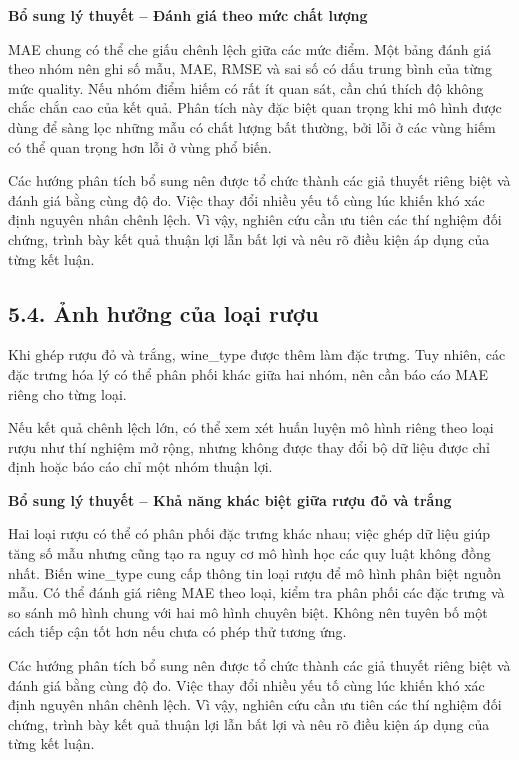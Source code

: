 \documentclass[12pt,a4paper,oneside]{article}
\begin{document}
\par\noindent\textbf{Bổ sung lý thuyết -- Đánh giá theo mức chất lượng}\par
MAE chung có thể che giấu chênh lệch giữa các mức điểm. Một bảng đánh giá theo nhóm nên ghi số mẫu, MAE, RMSE và sai số có dấu trung bình của từng mức quality. Nếu nhóm điểm hiếm có rất ít quan sát, cần chú thích độ không chắc chắn cao của kết quả. Phân tích này đặc biệt quan trọng khi mô hình được dùng để sàng lọc những mẫu có chất lượng bất thường, bởi lỗi ở các vùng hiếm có thể quan trọng hơn lỗi ở vùng phổ biến.\par

Các hướng phân tích bổ sung nên được tổ chức thành các giả thuyết riêng biệt và đánh giá bằng cùng độ đo. Việc thay đổi nhiều yếu tố cùng lúc khiến khó xác định nguyên nhân chênh lệch. Vì vậy, nghiên cứu cần ưu tiên các thí nghiệm đối chứng, trình bày kết quả thuận lợi lẫn bất lợi và nêu rõ điều kiện áp dụng của từng kết luận.\par

\subsection*{5.4. Ảnh hưởng của loại rượu}

Khi ghép rượu đỏ và trắng, wine\_type được thêm làm đặc trưng. Tuy
nhiên, các đặc trưng hóa lý có thể phân phối khác giữa hai nhóm, nên cần
báo cáo MAE riêng cho từng loại.

Nếu kết quả chênh lệch lớn, có thể xem xét huấn luyện mô hình riêng theo
loại rượu như thí nghiệm mở rộng, nhưng không được thay đổi bộ dữ liệu
được chỉ định hoặc báo cáo chỉ một nhóm thuận lợi.


\par\noindent\textbf{Bổ sung lý thuyết -- Khả năng khác biệt giữa rượu đỏ và trắng}\par
Hai loại rượu có thể có phân phối đặc trưng khác nhau; việc ghép dữ liệu giúp tăng số mẫu nhưng cũng tạo ra nguy cơ mô hình học các quy luật không đồng nhất. Biến wine\_type cung cấp thông tin loại rượu để mô hình phân biệt nguồn mẫu. Có thể đánh giá riêng MAE theo loại, kiểm tra phân phối các đặc trưng và so sánh mô hình chung với hai mô hình chuyên biệt. Không nên tuyên bố một cách tiếp cận tốt hơn nếu chưa có phép thử tương ứng.\par

Các hướng phân tích bổ sung nên được tổ chức thành các giả thuyết riêng biệt và đánh giá bằng cùng độ đo. Việc thay đổi nhiều yếu tố cùng lúc khiến khó xác định nguyên nhân chênh lệch. Vì vậy, nghiên cứu cần ưu tiên các thí nghiệm đối chứng, trình bày kết quả thuận lợi lẫn bất lợi và nêu rõ điều kiện áp dụng của từng kết luận.\par
\end{document}
